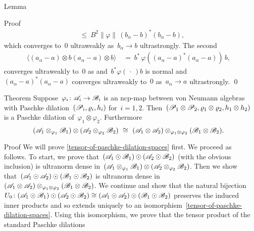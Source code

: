 \begin{parsec}
\begin{point}{Lemma}
\begin{point}{Proof}
\begin{align*}
    & \ \leq \ 
    B^2 \|\varphi\| \,(b_\alpha - b)^*  (b_\alpha - b),
\end{align*}
which converges to~$0$ ultraweakly as~$b_\alpha \to b$ ultrastrongly.
The second
\begin{align*}
    \langle
        (a_\alpha - a) \otimes b
        (a_\alpha - a) \otimes b \rangle
        & \ = \ 
        b^* \,\varphi((a_\alpha - a)^* (a_\alpha - a)) \, b,
\end{align*}
converges ultraweakly to~$0$
as and~$ b^* \varphi(\,\cdot\,) b$ is normal
and~$(a_\alpha - a)^*(a_\alpha - a)$ converges ultraweakly to~$0$
as~$a_\alpha \to a$ ultrastrongly. \qed
\end{point}
\end{point}
\end{parsec}

\begin{parsec}%
\begin{point}[paschke-tensor]{Theorem}%
Suppose~$\varphi_i \colon \mathscr{A}_i \to \mathscr{B}_i$
    is an ncp-map between von Neumann algebras
    with Paschke dilation~$(\mathscr{P}_i, \varrho_i, h_i)$
    for~$i=1,2$.
Then~$(\mathscr{P}_1 \otimes \mathscr{P}_2, \varrho_1 \otimes \varrho_2, h_1\otimes h_2)$
    is a Paschke dilation of~$\varphi_1 \otimes \varphi_2$.
    Furthermore
\begin{equation}\label{tensor-of-paschke-dilation-spaces}
(\scrA_1 \otimes_{\varphi_1} \scrB_1)
\otimes (\scrA_2 \otimes_{\varphi_2} \scrB_2)
\ \cong \ 
(\scrA_1 \otimes \scrA_2) \otimes_{\varphi_1\otimes \varphi_2} (\scrB_1 \otimes \scrB_2).
\end{equation}
\begin{point}{Proof}%
We will prove \eqref{tensor-of-paschke-dilation-spaces} first.
We proceed as follows.
To start, we prove that~$
(\mathscr{A}_1 \odot \mathscr{B}_1) \odot (\mathscr{A}_2 \odot \mathscr{B}_2)$
    (with the obvious inclusion)
    is ultranorm dense in~$(\mathscr{A}_1 \otimes_{\varphi_1} \mathscr{B}_1)
\otimes (\mathscr{A}_2 \otimes_{\varphi_2} \mathscr{B}_2)$.
Then we show that~$
(\mathscr{A}_1 \odot \mathscr{A}_2) \odot (\mathscr{B}_1 \odot \mathscr{B}_2) $
is ultranorm dense in~$
(\mathscr{A}_1 \otimes \mathscr{A}_2) \otimes_{\varphi_1\otimes \varphi_2} (\mathscr{B}_1 \otimes \mathscr{B}_2)$.
We continue and show that the natural bijection
$U_0\colon (\mathscr{A}_1 \odot \mathscr{B}_1) \odot (\mathscr{A}_2 \odot \mathscr{B}_2) \cong
(\mathscr{A}_1 \odot \mathscr{A}_2) \odot (\mathscr{B}_1 \odot \mathscr{B}_2) $
preserves the induced inner products and
    so extends uniquely to an
    isomorphism~\eqref{tensor-of-paschke-dilation-spaces}.
Using this isomorphism,
    we prove that the tensor product of the standard Paschke dilations

\end{point}
\end{point}
\end{parsec}
